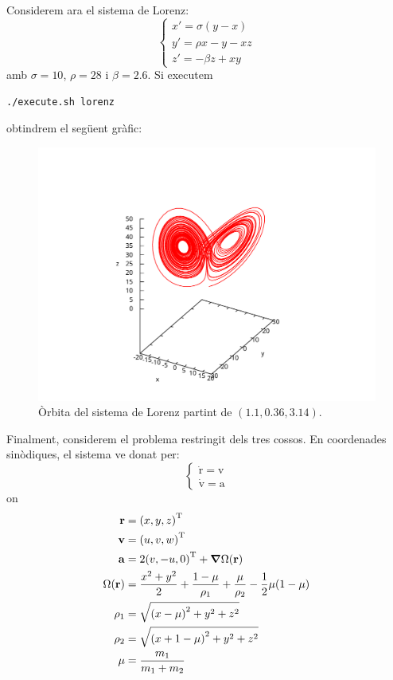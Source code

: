 \documentclass[10pt,a4paper]{article}
\newcommand{\vf}[1]{\boldsymbol{\mathrm{#1}}} %
\theoremstyle{definition}
\theoremstyle{remark}
\begin{document}
Considerem ara el sistema de Lorenz:
$$
  \begin{cases}
    x'=\sigma(y-x)     \\
    y'=\rho x - y - xz \\
    z'=-\beta z + xy
  \end{cases}
$$
amb $\sigma=10$, $\rho=28$ i $\beta=2.6$. Si executem
\begin{lstlisting}[language=Bash]
./execute.sh lorenz
\end{lstlisting}
obtindrem el següent gràfic:
\begin{figure}[ht]
  \centering\vspace{-2cm}
  \includegraphics[width=0.7\linewidth]{Images/lorenz.pdf}
  \caption{Òrbita del sistema de Lorenz partint de $(1.1,0.36,3.14)$.}
\end{figure}
Finalment, considerem el problema restringit dels tres cossos. En coordenades sinòdiques, el sistema ve donat per:
$$
  \begin{cases}
    \vf{\dot{r}} = \vf{v} \\
    \vf{\dot{v}} = \vf{a}
  \end{cases}
$$
on
\begin{align*}
  \vf{r}         & ={(x,y,z)}^\mathrm{T}                                                              \\
  \vf{v}         & ={(u,v,w)}^\mathrm{T}                                                              \\
  \vf{a}         & =2{(v,-u,0)}^\mathrm{T}+\grad\Omega(\vf{r})                                        \\
  \Omega(\vf{r}) & =\frac{x^2+y^2}{2} + \frac{1-\mu}{\rho_1}+\frac{\mu}{\rho_2}-\frac{1}{2}\mu(1-\mu) \\
  \rho_1         & =\sqrt{{(x-\mu)}^2+y^2+z^2}                                                        \\
  \rho_2         & =\sqrt{{(x+1-\mu)}^2+y^2+z^2}                                                      \\
  \mu            & =\frac{m_1}{m_1+m_2}
\end{align*}
\end{document}
